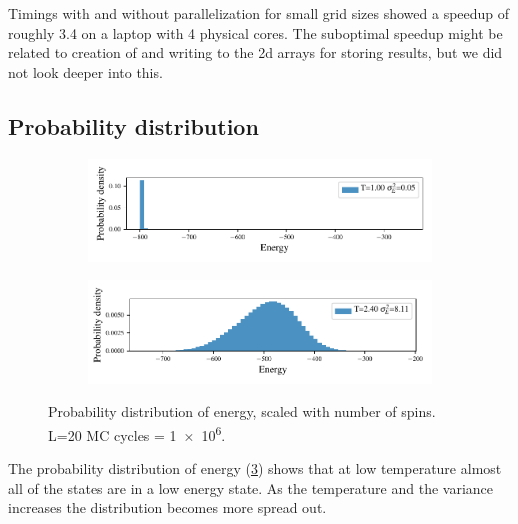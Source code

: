Timings with and without parallelization for small grid sizes showed a speedup
of roughly 3.4 on a laptop with 4 physical cores. The suboptimal speedup might
be related to creation of and writing to the 2d arrays for storing results,
but we did not look deeper into this.

\subsection{Probability distribution}

\begin{figure}[ht]
  \begin{subfigure}[t]{\textwidth} %
    \centering
    \includegraphics[width=\linewidth]{../figures/distribution_0.pdf}
    \caption{}
    \label{fig:sub-first}
  \end{subfigure}
  \hfill
  \newline
  \begin{subfigure}[t]{\textwidth}
    \centering
    \includegraphics[width=\linewidth]{../figures/distribution_5.pdf}
    \caption{}
    \label{fig:sub-second}
  \end{subfigure}
  \label{fig:distribution}
  \caption{Probability distribution of energy, scaled with number of spins. L=20
  MC cycles = \num{1e6}.}
\end{figure}


The probability distribution of energy (\cref{fig:distribution}) shows that
at low temperature almost all of the states are in a low energy state.
As the temperature and the variance increases the distribution becomes more
spread out.
